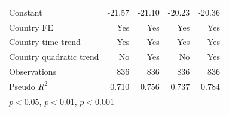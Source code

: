 \documentclass[12pt,a4paper,titlepage]{article}
\begin{document}
\begin{table}[htbp]
\begin{tabular}{l*{4}{D{.}{.}{-1}}}
Constant                &      -21.57\sym{***}&      -21.10\sym{***}&      -20.23\sym{***}&      -20.36\sym{***}\\
Country FE          &         Yes         &         Yes         &         Yes         &         Yes         \\
Country time trend  &         Yes         &         Yes         &         Yes         &         Yes         \\
Country quadratic trend&          No         &         Yes         &          No         &         Yes         \\
\hline
Observations        &         836         &         836         &         836         &         836         \\
Pseudo \(R^{2}\)    &       0.710         &       0.756         &       0.737         &       0.784         \\
\hline\hline
{}\\
\end{tabular}
\end{table}
\end{document}
